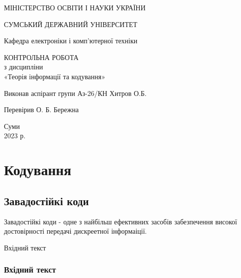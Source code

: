 \documentclass[a4paper,14pt]{extreport}
\begin{document}
\begin{titlepage}
	\begin{center}
		\large
		МІНІСТЕРСТВО ОСВІТИ І НАУКИ УКРАЇНИ
		
		\vspace{0.5cm}
		
		СУМСЬКИЙ ДЕРЖАВНИЙ УНІВЕРСИТЕТ\\
		
		\vspace{0.25cm}
		
		Кафедра електроніки і комп'ютерної техніки
		\vspace{2.5cm}
		\vfill
		
		\textsc{КОНТРОЛЬНА РОБОТА}\\[2mm]
		
		з дисципліни \\«Теорія інформації та кодування»
		\vfill
		
	
		
	\end{center}
	\vfill
	
	\newlength{\ML}
	\settowidth{\ML}{}
	Виконав аспірант групи Аз-26/КН Хитров О.Б.
	\bigskip
	

	Перевірив О. Б. Бережна
	\vfill
	
	\vspace{5cm}
	
	\begin{center}
		Суми\\ 2023 р.
	\end{center}
	
\end{titlepage}
	
	\section{Кодування}
	\subsection{Завадостійкі коди}
	Завадостійкі коди - одне з найбільш ефективних засобів забезпечення високої достовірності передачі дискреетної інформаіції.

Вхідний текст

\subsubsection{Вхідний текст}
\end{document}
